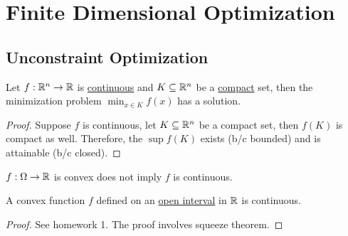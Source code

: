 \documentclass{article}
\begin{document}
	\section{Finite Dimensional Optimization}
	\subsection{Unconstraint Optimization}
    \begin{theorem}
        Let $f: \mathbb{R}^n \to \mathbb{R}$ is \ul{continuous} and $K \subseteq \mathbb{R}^n$ be a \ul{compact} set, then the minimization problem $\min_{x \in K} f(x)$ has a solution.
    \end{theorem}
    \begin{proof}
    	Suppose $f$ is continuous, let $K \subseteq \mathbb{R}^n$ be a compact set, then $f(K)$ is compact as well. Therefore, the $\sup f(K)$ exists (b/c bounded) and is attainable (b/c closed).
    \end{proof}
    
    \begin{remark}
    	$f: \Omega \to \mathbb{R}$ is convex does not imply $f$ is continuous.
    \end{remark}
    
%    
    
    \begin{proposition}
    	A convex function $f$ defined on an \ul{open interval} in $\mathbb{R}$ is continuous.
    \end{proposition}
    
    \begin{proof}
    	See homework 1. The proof involves squeeze theorem.
    \end{proof}
    
\end{document}
